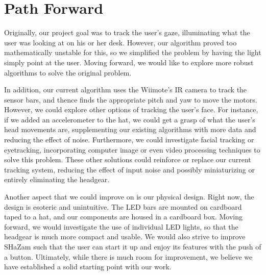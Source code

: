 \documentclass[conference, twocolumn]{IEEEtran}
\begin{document}
\section{Path Forward}
Originally, our project goal was to track the user's gaze, illuminating what the user was looking at on his or her desk. However, our algorithm proved too mathematically unstable for this, so we simplified the problem by having the light simply point at the user. Moving forward, we would like to explore more robust algorithms to solve the original problem. 

In addition, our current algorithm uses the Wiimote's IR camera to track the sensor bars, and thence finds the appropriate pitch and yaw to move the motors. However, we could explore other options of tracking the user's face. For instance, if we added an accelerometer to the hat, we could get a grasp of what the user's head movements are, supplementing our existing algorithms with more data and reducing the effect of noise. Furthermore, we could investigate facial tracking or eyetracking, incorporating computer image or even video processing techniques to solve this problem. These other solutions could reinforce or replace our current tracking system, reducing the effect of input noise and possibly miniaturizing or entirely eliminating the headgear.

Another aspect that we could improve on is our physical design. Right now, the design is esoteric and unintuitive. The LED bars are mounted on cardboard taped to a hat, and our components are housed in a cardboard box. Moving forward, we would investigate the use of individual LED lights, so that the headgear is much more compact and usable. We would also strive to improve SHaZam such that the user can start it up and enjoy its features with the push of a button. Ultimately, while there is much room for improvement, we believe we have established a solid starting point with our work. 



% 
%
%
%
\end{document}
